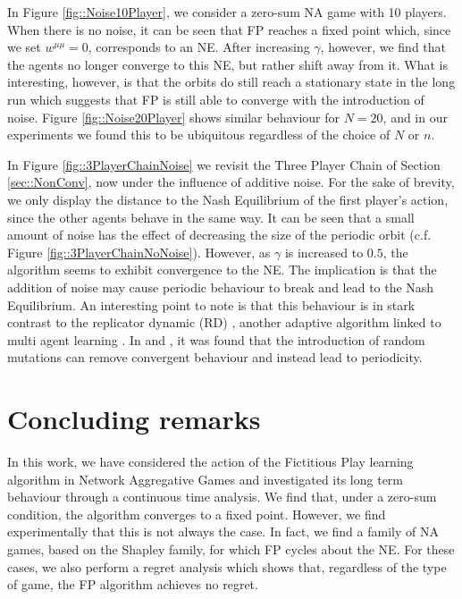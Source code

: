 \documentclass{article}
\theoremstyle{definition}
\begin{document}
  In Figure \ref{fig::Noise10Player}, we consider a zero-sum NA game with 10 players. When there is
  no noise, it can be seen that FP reaches a fixed point which, since we set $w^{\mu \mu} = 0$,
  corresponds to an NE. After increasing $\gamma$, however, we find that the agents no longer
  converge to this NE, but rather shift away from it. What is interesting, however, is that the
  orbits do still reach a stationary state in the long run which suggests that FP is still able to
  converge with the introduction of noise. Figure \ref{fig::Noise20Player} shows similar behaviour
  for $N = 20$, and in our experiments we found this to be ubiquitous regardless of the choice of
  $N$ or $n$. 

  In Figure \ref{fig::3PlayerChainNoise} we revisit the Three Player Chain of Section
  \ref{sec::NonConv}, now under the influence of additive noise. For the sake of brevity, we only
  display the distance to the Nash Equilibrium of the first player's action, since the other agents
  behave in the same way. It can be seen that a small amount of noise has the effect of decreasing
  the size of the periodic orbit (c.f. Figure \ref{fig::3PlayerChainNoNoise}). However, as $\gamma$
  is increased to $0.5$, the algorithm seems to exhibit convergence to the NE. The implication is
  that the addition of noise may cause periodic behaviour to break and lead to the Nash Equilibrium.
  An interesting point to note is that this behaviour is in stark contrast to the replicator
  dynamic (RD) \cite{Maynard-Smith}, another adaptive algorithm linked to multi agent learning
  \cite{CyclesAdversarialLearning}. In \cite{Imhof} and \cite{Galla}, it was found that the
  introduction of random mutations can remove convergent behaviour and instead lead to periodicity. 
  
\section{Concluding remarks}
	In this work, we have considered the action of the Fictitious Play learning algorithm in Network Aggregative Games and investigated its long term behaviour through a continuous time analysis. We find that, under a zero-sum condition, the algorithm converges to a fixed point. However, we find experimentally that this is not always the case. In fact, we find a family of NA games, based on the Shapley family, for which FP cycles about the NE. For these cases, we also perform a regret analysis which shows that, regardless of the type of game, the FP algorithm achieves no regret. 
	
\end{document}
